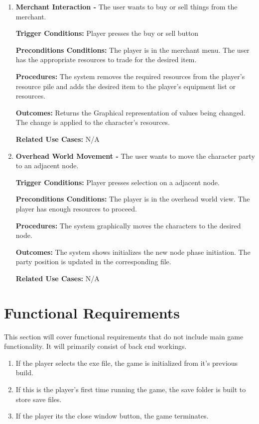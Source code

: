 \documentclass{article}
\begin{document}
\begin{enumerate}[{PUC}1. ]
	\item \textbf{Merchant Interaction -} The user wants to buy or sell things from the merchant. \par
\textbf{Trigger Conditions: }Player presses the buy or sell button \par
\textbf{Preconditions Conditions: }The player is in the merchant menu. The user has the appropriate resources to trade for the desired item.\par
\textbf{Procedures: }The system removes the required resources from the player's resource pile and adds the desired item to the player's equipment list or resources. \par
\textbf{Outcomes: }Returns the Graphical representation of values being changed. The change is applied to the character's resources. \par
\textbf{Related Use Cases: }N/A \par

	\item \textbf{Overhead World Movement -} The user wants to move the character party to an adjacent node. \par
\textbf{Trigger Conditions: }Player presses selection on a adjacent node. \par
\textbf{Preconditions Conditions: }The player is in the overhead world view. The player has enough resources to proceed.\par
\textbf{Procedures: }The system graphically moves the characters to the desired node. \par
\textbf{Outcomes: }The system shows initializes the new node phase initiation. The party position is updated in the corresponding file. \par
\textbf{Related Use Cases: }N/A \par
\end{enumerate}
\section{Functional Requirements}
\quad This section will cover functional requirements that do not include main game functionality. It will primarily consist of back end workings.
\begin{enumerate}[{FR}1. ]
	\item If the player selects the exe file, the game is initialized from it’s previous build.
	\item If this is the player's first time running the game, the save folder is built to store save files.
	\item If the player its the close window button, the game terminates.
\end{enumerate}
\end{document}
